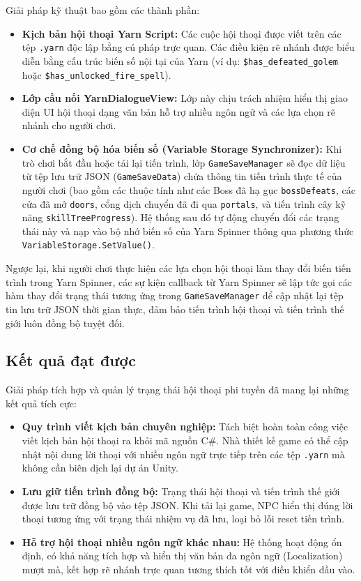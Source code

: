 Giải pháp kỹ thuật bao gồm các thành phần:
\begin{itemize}
    \item \textbf{Kịch bản hội thoại Yarn Script:} Các cuộc hội thoại được viết trên các tệp \texttt{.yarn} độc lập bằng cú pháp trực quan. Các điều kiện rẽ nhánh được biểu diễn bằng cấu trúc biến số nội tại của Yarn (ví dụ: \texttt{\$has\_defeated\_golem} hoặc \texttt{\$has\_unlocked\_fire\_spell}).
    \item \textbf{Lớp cầu nối YarnDialogueView:} Lớp này chịu trách nhiệm hiển thị giao diện UI hội thoại dạng văn bản hỗ trợ nhiều ngôn ngữ và các lựa chọn rẽ nhánh cho người chơi.
    \item \textbf{Cơ chế đồng bộ hóa biến số (Variable Storage Synchronizer):} Khi trò chơi bắt đầu hoặc tải lại tiến trình, lớp \texttt{GameSaveManager} sẽ đọc dữ liệu từ tệp lưu trữ JSON (\texttt{GameSaveData}) chứa thông tin tiến trình thực tế của người chơi (bao gồm các thuộc tính như các Boss đã hạ gục \texttt{bossDefeats}, các cửa đã mở \texttt{doors}, cổng dịch chuyển đã đi qua \texttt{portals}, và tiến trình cây kỹ năng \texttt{skillTreeProgress}). Hệ thống sau đó tự động chuyển đổi các trạng thái này và nạp vào bộ nhớ biến số của Yarn Spinner thông qua phương thức \texttt{VariableStorage.\allowbreak SetValue()}.
\end{itemize}

Ngược lại, khi người chơi thực hiện các lựa chọn hội thoại làm thay đổi biến tiến trình trong Yarn Spinner, các sự kiện callback từ Yarn Spinner sẽ lập tức gọi các hàm thay đổi trạng thái tương ứng trong \texttt{GameSaveManager} để cập nhật lại tệp tin lưu trữ JSON thời gian thực, đảm bảo tiến trình hội thoại và tiến trình thế giới luôn đồng bộ tuyệt đối.

\subsection{Kết quả đạt được}
Giải pháp tích hợp và quản lý trạng thái hội thoại phi tuyến đã mang lại những kết quả tích cực:
\begin{itemize}
    \item \textbf{Quy trình viết kịch bản chuyên nghiệp:} Tách biệt hoàn toàn công việc viết kịch bản hội thoại ra khỏi mã nguồn C\#. Nhà thiết kế game có thể cập nhật nội dung lời thoại với nhiều ngôn ngữ trực tiếp trên các tệp \texttt{.yarn} mà không cần biên dịch lại dự án Unity.
    \item \textbf{Lưu giữ tiến trình đồng bộ:} Trạng thái hội thoại và tiến trình thế giới được lưu trữ đồng bộ vào tệp JSON. Khi tải lại game, NPC hiển thị đúng lời thoại tương ứng với trạng thái nhiệm vụ đã lưu, loại bỏ lỗi reset tiến trình.
    \item \textbf{Hỗ trợ hội thoại nhiều ngôn ngữ khác nhau:} Hệ thống hoạt động ổn định, có khả năng tích hợp và hiển thị văn bản đa ngôn ngữ (Localization) mượt mà, kết hợp rẽ nhánh trực quan tương thích tốt với điều khiển đầu vào.
\end{itemize}
